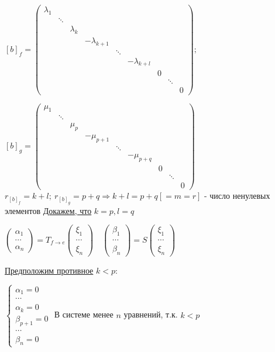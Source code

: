 $[b]_f = 
\begin{pmatrix}
\lambda_1 \\
 & \ddots \\          
 & & \lambda_k \\
 & & & -\lambda_{k+1} \\
 & & & & \ddots \\
 & & & & & -\lambda_{k+l} \\
 & & & & & & 0 \\
 & & & & & & & \ddots \\
 & & & & & & & &0
\end{pmatrix};$

$ [b]_g = 
\begin{pmatrix}
\mu_1 \\
 & \ddots \\          
 & & \mu_p \\
 & & & -\mu_{p+1} \\
 & & & & \ddots \\
 & & & & & -\mu_{p+q} \\
 & & & & & & 0 \\
 & & & & & & & \ddots \\
 & & & & & & & &0 
\end{pmatrix}
$\\

$r_{[b]_f} = k+l;\ r_{[b]_g} = p+q \Rightarrow k+l = p+q [= m = r]$ - число ненулевых элементов
\underline{Докажем, что} $k = p, l = q$

$\begin{pmatrix} \alpha_1 \\ \cdots \\ \alpha_n \end{pmatrix} = T_{f\to e} \begin{pmatrix} \xi_1 \\ \cdots \\ \xi_n \end{pmatrix} \quad \begin{pmatrix} \beta_1 \\ \cdots \\ \beta_n \end{pmatrix} = S \begin{pmatrix} \xi_1 \\ \cdots \\ \xi_n \end{pmatrix}$

\underline{Предположим противное} $k < p:$

$\left\{ \begin{matrix} \alpha_1 = 0 \\ \cdots \\ \alpha_k = 0 \\ \beta_{p+1} = 0 \\ \cdots \\ \beta_n = 0 \end{matrix} \right.$ В системе менее $n$ уравнений, т.к. $k<p$

